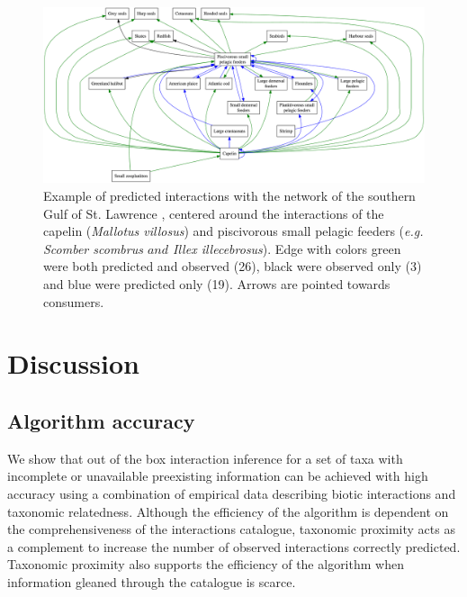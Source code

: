 \begin{figure}[H]
  \centering\includegraphics[width=\textwidth]{./figures/ch2-SGSL.png}
  \caption{Example of predicted interactions with the network of the southern Gulf of St. Lawrence \citep{savenkoff2004}, centered around the interactions of the capelin (\textit{Mallotus villosus}) and piscivorous small pelagic feeders (\textit{e.g. Scomber scombrus $and$ Illex illecebrosus}). Edge with colors green were both predicted and observed (26), black were observed only (3) and blue were predicted only (19). Arrows are pointed towards consumers.}
  \label{fig:SGSL}
\end{figure}

\section{Discussion}
\subsection{Algorithm accuracy}
We show that out of the box interaction inference for a set of taxa with incomplete or unavailable preexisting information can be achieved with high accuracy using a combination of empirical data describing biotic interactions and taxonomic relatedness. Although the efficiency of the algorithm is dependent on the comprehensiveness of the interactions catalogue, taxonomic proximity acts as a complement to increase the number of observed interactions correctly predicted. Taxonomic proximity also supports the efficiency of the algorithm when information gleaned through the catalogue is scarce.

